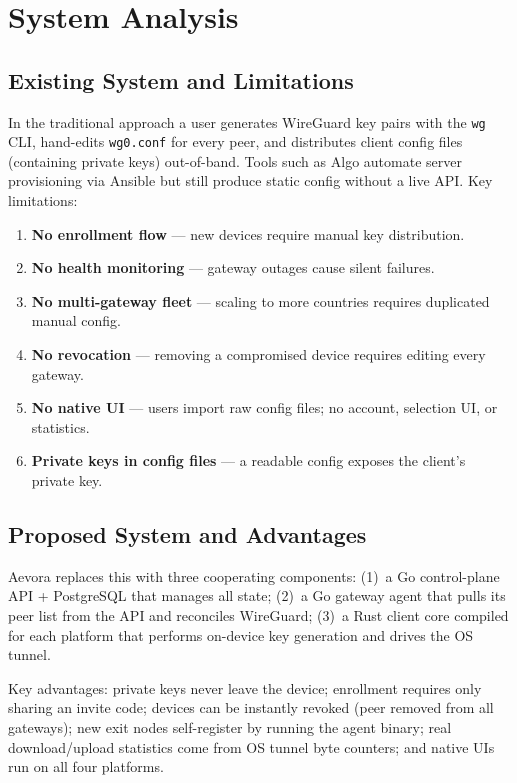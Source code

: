 \documentclass[12pt,a4paper]{report}
\begin{document}
\chapter{System Analysis}

\section{Existing System and Limitations}

In the traditional approach a user generates WireGuard key pairs with the \texttt{wg} CLI, hand-edits \texttt{wg0.conf} for every peer, and distributes client config files (containing private keys) out-of-band. Tools such as Algo automate server provisioning via Ansible but still produce static config without a live API. Key limitations:

\begin{enumerate}[leftmargin=*, topsep=2pt, itemsep=0pt]
  \item \textbf{No enrollment flow} — new devices require manual key distribution.
  \item \textbf{No health monitoring} — gateway outages cause silent failures.
  \item \textbf{No multi-gateway fleet} — scaling to more countries requires duplicated manual config.
  \item \textbf{No revocation} — removing a compromised device requires editing every gateway.
  \item \textbf{No native UI} — users import raw config files; no account, selection UI, or statistics.
  \item \textbf{Private keys in config files} — a readable config exposes the client's private key.
\end{enumerate}

\section{Proposed System and Advantages}

Aevora replaces this with three cooperating components: (1)~a Go control-plane API + PostgreSQL that manages all state; (2)~a Go gateway agent that pulls its peer list from the API and reconciles WireGuard; (3)~a Rust client core compiled for each platform that performs on-device key generation and drives the OS tunnel.

Key advantages: private keys never leave the device; enrollment requires only sharing an invite code; devices can be instantly revoked (peer removed from all gateways); new exit nodes self-register by running the agent binary; real download/upload statistics come from OS tunnel byte counters; and native UIs run on all four platforms.
\end{document}
